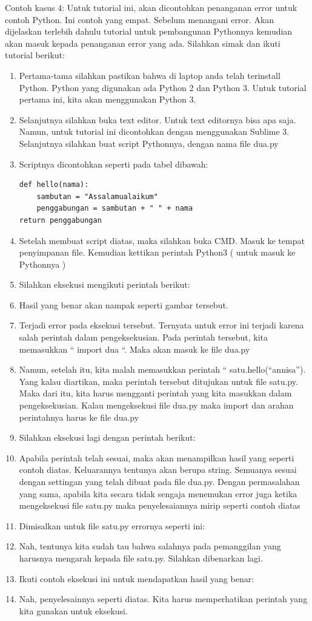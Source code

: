 Contoh kasus 4: Untuk tutorial ini, akan dicontohkan penanganan error untuk contoh Python. Ini contoh yang empat. Sebelum menangani error. Akan dijelaskan terlebih dahulu tutorial untuk pembangunan Pythonnya kemudian akan masuk kepada penanganan error yang ada. Silahkan simak dan ikuti tutorial berikut: 
\begin{enumerate}
\item Pertama-tama silahkan pastikan bahwa di laptop anda telah terinstall Python. Python yang digunakan ada Python 2 dan Python 3. Untuk tutorial pertama ini, kita akan menggunakan Python 3.
\item Selanjutnya silahkan buka text editor. Untuk text editornya bisa apa saja. Namun, untuk tutorial ini dicontohkan dengan menggunakan Sublime 3. Selanjutnya silahkan buat script Pythonnya, dengan nama file dua.py
\item Scriptnya dicontohkan seperti pada tabel dibawah:
\begin{verbatim}
def hello(nama):
	sambutan = "Assalamualaikum"
	penggabungan = sambutan + " " + nama
return penggabungan
\end{verbatim}
\item Setelah membuat script diatas, maka silahkan buka CMD. Masuk ke tempat penyimpanan file. Kemudian kettikan perintah Python3 ( untuk masuk ke Pythonnya )
\item Silahkan eksekusi mengikuti perintah berikut:
\item Hasil yang benar akan nampak seperti gambar tersebut.
\item Terjadi error pada eksekusi tersebut. Ternyata untuk error ini terjadi karena salah perintah dalam pengeksekusian. Pada perintah tersebut, kita memasukkan “ import dua “. Maka akan masuk ke file dua.py
\item Namun, setelah itu, kita malah memasukkan perintah “ satu.hello(“annisa”). Yang kalau diartikan, maka perintah tersebut ditujukan untuk file satu.py. Maka dari itu, kita harus mengganti perintah yang kita masukkan dalam pengeksekusian. Kalau mengeksekusi file dua.py maka import dan arahan perintahnya harus ke file dua.py
\item Silahkan eksekusi lagi dengan perintah berikut:
\item Apabila perintah telah sesuai, maka akan menampilkan hasil yang seperti contoh diatas. Keluarannya tentunya akan berupa string. Semuanya sesuai dengan settingan yang telah dibuat pada file dua.py. Dengan permasalahan yang sama, apabila kita secara tidak sengaja menemukan error juga ketika mengeksekusi file satu.py maka penyelesaiannya mirip seperti contoh diatas
\item Dimisalkan untuk file satu.py errornya seperti ini:
\item Nah, tentunya kita sudah tau bahwa salahnya pada pemanggilan yang harusnya mengarah kepada file satu.py. Silahkan dibenarkan lagi.
\item Ikuti contoh eksekusi ini untuk mendapatkan hasil yang benar:
\item Nah, penyelesainnya seperti diatas. Kita harus memperhatikan perintah yang kita gunakan untuk eksekusi.
\end{enumerate}

